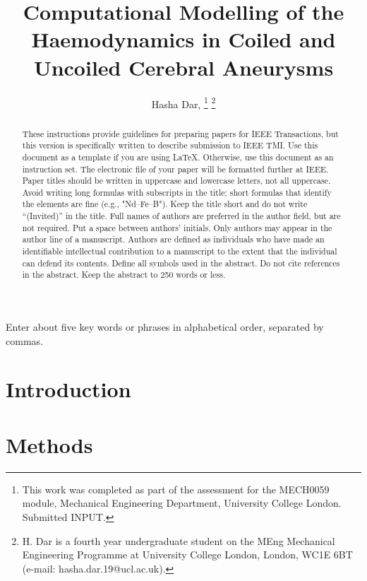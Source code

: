 \documentclass[journal,twoside,web]{ieeecolor}
\begin{document}
\title{Computational Modelling of the Haemodynamics in Coiled and Uncoiled Cerebral Aneurysms}
\author{Hasha Dar,
    \thanks{This work was completed as part of the assessment for the MECH0059 module, Mechanical Engineering Department, University College London. Submitted INPUT. }
    \thanks{H. Dar is a fourth year undergraduate student on the MEng Mechanical Engineering Programme at University College London, London, WC1E 6BT (e-mail: hasha.dar.19@ucl.ac.uk). }}

\maketitle

\begin{abstract}
    These instructions provide guidelines for preparing papers for IEEE Transactions,
    but this version is specifically written to describe submission to IEEE TMI.
    Use this document as a template if you are using \LaTeX.
    Otherwise, use this document as an instruction set.
    The electronic file of your paper will be formatted further at IEEE.
    Paper titles should be written in uppercase and lowercase letters, not all uppercase.
    Avoid writing long formulas with subscripts in the title;
    short formulas that identify the elements are fine (e.g., "Nd--Fe--B").
    Keep the title short and do not write ``(Invited)'' in the title.
    Full names of authors are preferred in the author field, but are not required.
    Put a space between authors' initials. Only authors may appear in the author line
    of a manuscript. Authors are defined as individuals who have made an identifiable
    intellectual contribution to a manuscript to the extent that the individual can defend its contents.
    Define all symbols used in the abstract. Do not cite references in the abstract.
    Keep the abstract to 250 words or less.
\end{abstract}

\begin{IEEEkeywords}
    Enter about five key words or phrases in alphabetical order, separated by commas.
\end{IEEEkeywords}

\section{Introduction}
\section{Methods}
\end{document}
